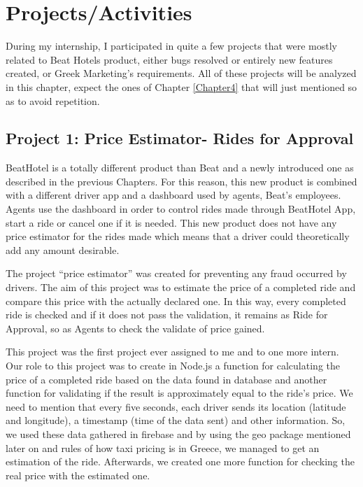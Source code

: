 
\chapter{Projects/Activities} %

\label{Chapter3}

During my internship, I participated in quite a few projects that were mostly related to Beat Hotels product, either bugs resolved or entirely new features created, or Greek Marketing’s requirements. All of these projects will be analyzed in this chapter, expect the ones of Chapter \ref{Chapter4} that will just mentioned so as to avoid repetition.

\section{Project 1: Price Estimator- Rides for Approval}

BeatHotel is a totally different product than Beat and a newly introduced one as described in the previous Chapters. For this reason, this new product is combined with a different driver app and a dashboard used by agents, Beat's employees. Agents use the dashboard in order to control rides made through BeatHotel App, start a ride or cancel one if it is needed. This new product does not have any price estimator for the rides made which means that a driver could theoretically add any amount desirable. \par

The project “price estimator” was created for preventing any fraud occurred by drivers. The aim of this project was to estimate the price of a completed ride and compare this price with the actually declared one. In this way, every completed ride is checked  and if it does not pass the validation, it remains as Ride for Approval, so as Agents to check the validate of price gained. \par

This project was the first project ever assigned to me and to one more intern. Our role to this project was to create in Node.js a function for calculating the price of a completed ride based on the data found in database and another function for validating if the result is approximately equal to the ride's price. We need to mention that every five seconds, each driver sends its location (latitude and longitude), a timestamp (time of the data sent) and other information. So, we used these data gathered in firebase and by using the geo package mentioned later on and rules of how taxi pricing is in Greece, we managed to get an estimation of the ride. Afterwards, we created one more function for checking the real price with the estimated one. \par

